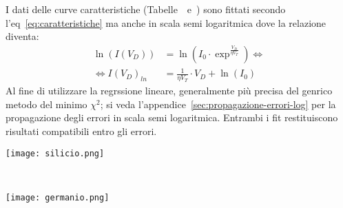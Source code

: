 \documentclass[@SRC@/main]{subfiles}
\begin{document}
I dati delle curve caratteristiche (Tabelle~~e~) sono
fittati secondo l'eq~\eqref{eq:caratteristiche} ma anche in scala semi logaritmica dove la
relazione diventa:
\begin{align*}
  \ln (I(V_D)) &= \ln \left( I_0 \cdot \exp^{\frac{V_D}{\eta V_T}} \right) \iff \\
  \iff I(V_D)_{ln} &= \frac{1}{\eta V_T} \cdot V_D + \ln (I_0)
\end{align*}
Al fine di utilizzare la regrssione lineare, generalmente più precisa del genrico
metodo del minimo $\chi^2$; si veda l'appendice~\ref{sec:propagazione-errori-log}
per la propagazione degli errori in scala semi logaritmica.
Entrambi i fit restituiscono risultati compatibili entro gli errori.
\begin{center}
\begin{minipage}{.95\textwidth}
  \centering
  \texttt{[image: silicio.png]}
  \label{fig:silicio}
\end{minipage}
\\
\begin{minipage}{.95\textwidth}
  \centering
  \texttt{[image: germanio.png]}
  \label{fig:germanio}
\end{minipage}
\end{center}
\end{document}
